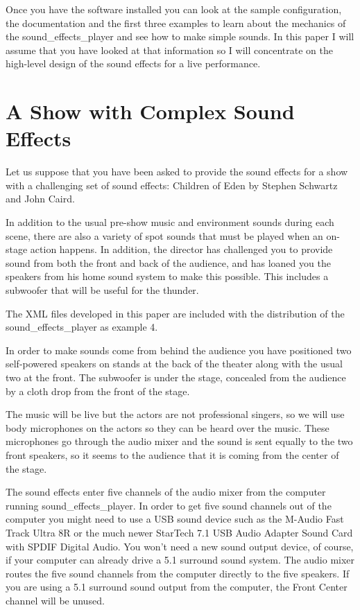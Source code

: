\documentclass[letterpaper,twoside]{article}
\begin{document}
Once you have the software installed you can look at the sample
configuration, the documentation and the first three examples
to learn about the
mechanics of the sound\_effects\_player and see how to make simple sounds.
In this paper I will assume that you have looked at that information
so I will concentrate on the high-level design of the sound
effects for a live performance.

\section{A Show with Complex Sound Effects}

Let us suppose that you have been asked to provide the sound effects
for a show with a challenging set of sound effects:
Children of Eden by Stephen Schwartz and John Caird.

In addition to the usual pre-show music and environment sounds
during each scene,
there are also a variety of spot sounds that must be played
when an on-stage action happens.
In addition, the director has challenged you to provide sound from
both the front and back of the audience, and has loaned you
the speakers from his home sound system to make this possible.
This includes a subwoofer that will be useful for the thunder.

The XML files developed in this paper are included with the distribution
of the sound\_effects\_player as example 4.

In order to make sounds come from behind the audience you have
positioned two self-powered speakers on stands
at the back of the theater along with the usual two at the front.
The subwoofer is under the stage, concealed from the audience
by a cloth drop from the front of the stage.

The music will be live but the actors are not professional singers,
so we will use body microphones on the actors so they can be heard
over the music.  These microphones go through the audio mixer and
the sound is sent equally to the two front speakers, so it seems
to the audience that it is coming from the center of the stage.

The sound effects enter five channels of the audio mixer from
the computer running sound\_effects\_player.  In order to get
five sound channels out of the computer you might need to use a USB
sound device such as the M-Audio Fast Track Ultra 8R or
the much newer StarTech 7.1 USB Audio Adapter Sound Card with
SPDIF Digital Audio.  You won't need a new sound output device,
of course, if your computer can already drive a 5.1 surround sound system.
The audio mixer routes the five sound channels from the computer
directly to the five speakers.  If you are using a 5.1 surround sound
output from the computer, the Front Center channel will be unused.
\end{document}
